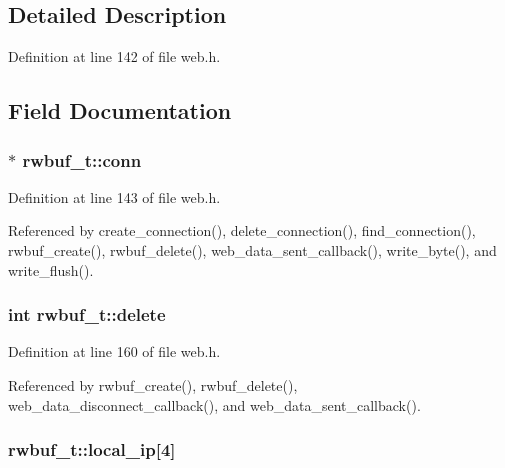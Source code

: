 \subsection{Detailed Description}


Definition at line 142 of file web.\-h.



\subsection{Field Documentation}
\hypertarget{structrwbuf__t_a15785240e32c27f7af7c4b0cb1a6e39b}{
\subsubsection[{conn}]{$\ast$ rwbuf\-\_\-t\-::conn}}\label{structrwbuf__t_a15785240e32c27f7af7c4b0cb1a6e39b}


Definition at line 143 of file web.\-h.



Referenced by create\-\_\-connection(), delete\-\_\-connection(), find\-\_\-connection(), rwbuf\-\_\-create(), rwbuf\-\_\-delete(), web\-\_\-data\-\_\-sent\-\_\-callback(), write\-\_\-byte(), and write\-\_\-flush().

\hypertarget{structrwbuf__t_a54e278f96a331cf0a61d22094c4b9f87}{
\subsubsection[{delete}]{\setlength{\rightskip}{0pt plus 5cm}int rwbuf\-\_\-t\-::delete}}\label{structrwbuf__t_a54e278f96a331cf0a61d22094c4b9f87}


Definition at line 160 of file web.\-h.



Referenced by rwbuf\-\_\-create(), rwbuf\-\_\-delete(), web\-\_\-data\-\_\-disconnect\-\_\-callback(), and web\-\_\-data\-\_\-sent\-\_\-callback().

\hypertarget{structrwbuf__t_aa26b4813db79aeaa293bb1eadfde0b54}{
\subsubsection[{local\-\_\-ip}]{ rwbuf\-\_\-t\-::local\-\_\-ip\mbox{[}4\mbox{]}}}\label{structrwbuf__t_aa26b4813db79aeaa293bb1eadfde0b54}


